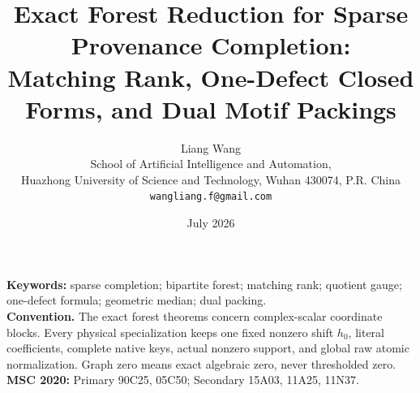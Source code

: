 \documentclass[11pt]{article}
\title{Exact Forest Reduction for Sparse Provenance Completion:\\
Matching Rank, One-Defect Closed Forms, and Dual Motif Packings}
\author{Liang Wang\\
School of Artificial Intelligence and Automation,\\
Huazhong University of Science and Technology, Wuhan 430074, P.R. China\\
\texttt{wangliang.f@gmail.com}}
\date{July 2026}
\theoremstyle{remark}
\begin{document}
\maketitle


\noindent\textbf{Keywords:} sparse completion; bipartite forest; matching
rank; quotient gauge; one-defect formula; geometric median; dual
packing.\\[0.5em]
\noindent\textbf{Convention.} The exact forest theorems concern
complex-scalar coordinate blocks.  Every physical specialization keeps
one fixed nonzero shift \(h_0\), literal coefficients, complete native
keys, actual nonzero support, and global raw atomic normalization.
Graph zero means exact algebraic zero, never thresholded zero.\\[0.5em]
\noindent\textbf{MSC 2020:} Primary 90C25, 05C50; Secondary 15A03,
11A25, 11N37.













\begingroup
\small
\raggedright


\endgroup
\end{document}
